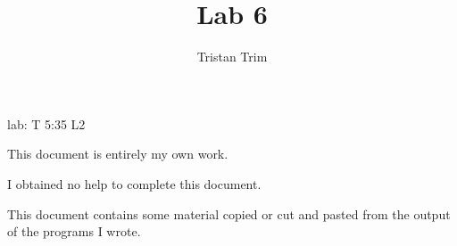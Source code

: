 \documentclass[10pt]{article}
\author{Tristan Trim}
\title{Lab 6}
\begin{document}
\maketitle


lab: T 5:35 L2




This document is entirely my own work.


I obtained no help to complete this document.



This document contains some material copied or cut and pasted from the output of the programs I wrote.
\end{document}
